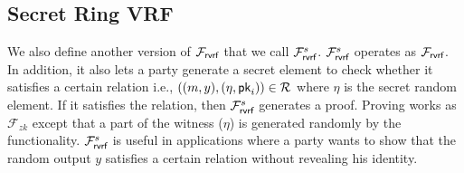%
%




\newcommand{\frvrfsec}{\fgvrf^s}
\subsection{Secret Ring VRF}
We also define another version of $ \mathcal{F}_{\textsf{rvrf}} $ that we call $ \frvrfsec $. $ \frvrfsec $ operates as $ \mathcal{F}_{\textsf{rvrf}} $. In addition, it also lets a party generate a secret  element to check whether it satisfies a certain relation i.e., $ ((m,y), (\eta, \mathsf{pk}_i)) \in \mathcal{R} $ where $ \eta $ is the secret random element. If it satisfies the relation, then $ \frvrfsec $ generates a proof. Proving works as $ \mathcal{F}_{zk} $ \cite{zkfunc} except that a part of the witness ($ \eta $) is generated randomly by the functionality. $ \frvrfsec $ is useful in applications where a party wants to show that the random output $ y $ satisfies a certain relation without revealing his identity.

